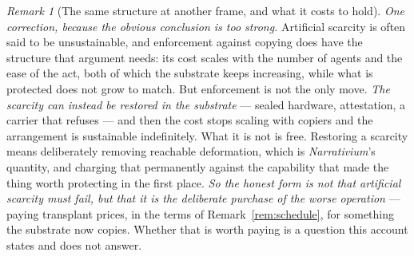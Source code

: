 \documentclass[11pt,a4paper]{article}
\theoremstyle{remark}
\newtheorem{remark}[definition]{Remark}
\begin{document}
\begin{remark}[The same structure at another frame, and what it costs to hold]
\emph{One correction, because the obvious conclusion is too strong.} Artificial scarcity is often said
to be unsustainable, and enforcement against copying does have the structure that argument needs: its
cost scales with the number of agents and the ease of the act, both of which the substrate keeps
increasing, while what is protected does not grow to match. But enforcement is not the only move.
\emph{The scarcity can instead be restored in the substrate} --- sealed hardware, attestation, a
carrier that refuses --- and then the cost stops scaling with copiers and the arrangement is
sustainable indefinitely. What it is not is free. Restoring a scarcity means deliberately removing
reachable deformation, which is \emph{Narrativium}'s quantity, and charging that permanently
against the capability that made the thing worth protecting in the first place. \emph{So the honest
form is not that artificial scarcity must fail, but that it is the deliberate purchase of the worse
operation} --- paying transplant prices, in the terms of Remark~\ref{rem:schedule}, for something the
substrate now copies. Whether that is worth paying is a question this account states and does not
answer.
\end{remark}
\end{document}
